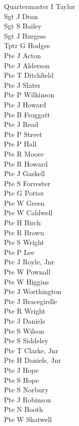 \begin{multicols}{2}
  \noindent
  Quartermaster I Taylor \\
  Sgt J Dean \\
  Sgt S Bailey \\
  Sgt J Burgess \\
  Tptr G Hodges \\
  Pte J Acton \\
  Pte J Alderson \\
  Pte T Ditchfield \\
  Pte J Slater \\
  Pte P Wilkinson \\
  Pte J Howard \\
  Pte B Froggatt \\
  Pte J Read \\
  Pte P Street \\
  Pte P Hall \\
  Pte R Moore \\
  Pte R Howard \\
  Pte J Gaskell \\
  Pte S Forrester \\
  Pte G Potter \\
  Pte W Green \\
  Pte W Caldwell \\
  Pte H Birch \\
  Pte R Brown \\
  Pte S Wright \\
  Pte P Lee \\
  Pte J Royle, Jnr \\
  Pte W Pownall \\
  Pte W Higgins \\
  Pte J Worthington \\
  Pte J Bracegirdle \\
  Pte R Wright \\
  Pte J Daniels \\
  Pte S Wilson \\
  Pte S Siddeley \\
  Pte T Clarke, Jnr \\
  Pte H Daniels, Jnr \\
  Pte J Hope \\
  Pte S Hope \\
  Pte S Norbury \\
  Pte J Robinson \\
  Pte N Booth \\
  Pte W Shatwell \\

\end{multicols}
